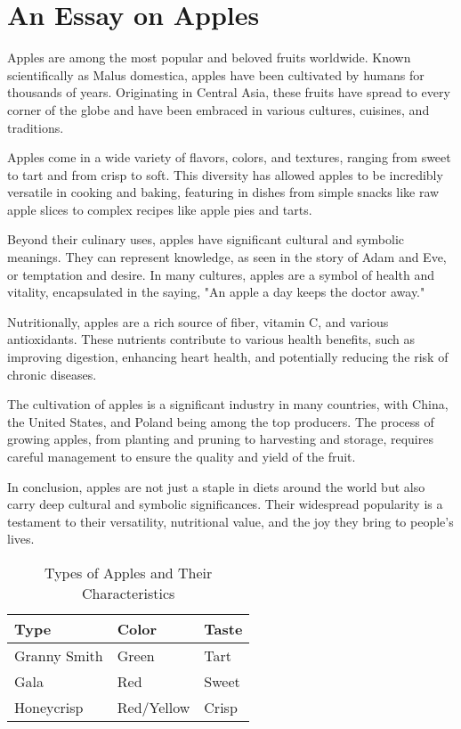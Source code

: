 \section{An Essay on Apples}

Apples are among the most popular and beloved fruits worldwide. Known scientifically as Malus domestica, apples have been cultivated by humans for thousands of years. Originating in Central Asia, these fruits have spread to every corner of the globe and have been embraced in various cultures, cuisines, and traditions.

Apples come in a wide variety of flavors, colors, and textures, ranging from sweet to tart and from crisp to soft. This diversity has allowed apples to be incredibly versatile in cooking and baking, featuring in dishes from simple snacks like raw apple slices to complex recipes like apple pies and tarts.

Beyond their culinary uses, apples have significant cultural and symbolic meanings. They can represent knowledge, as seen in the story of Adam and Eve, or temptation and desire. In many cultures, apples are a symbol of health and vitality, encapsulated in the saying, "An apple a day keeps the doctor away."

Nutritionally, apples are a rich source of fiber, vitamin C, and various antioxidants. These nutrients contribute to various health benefits, such as improving digestion, enhancing heart health, and potentially reducing the risk of chronic diseases.

The cultivation of apples is a significant industry in many countries, with China, the United States, and Poland being among the top producers. The process of growing apples, from planting and pruning to harvesting and storage, requires careful management to ensure the quality and yield of the fruit.

In conclusion, apples are not just a staple in diets around the world but also carry deep cultural and symbolic significances. Their widespread popularity is a testament to their versatility, nutritional value, and the joy they bring to people's lives.

\begin{table}[ht]
\centering
\begin{tabular}{l|l|l}
Type & Color & Taste \\
\hline
Granny Smith & Green & Tart \\
Gala & Red & Sweet \\
Honeycrisp & Red/Yellow & Crisp \\
\end{tabular}
\caption{Types of Apples and Their Characteristics}
\label{table:apples}
\end{table}